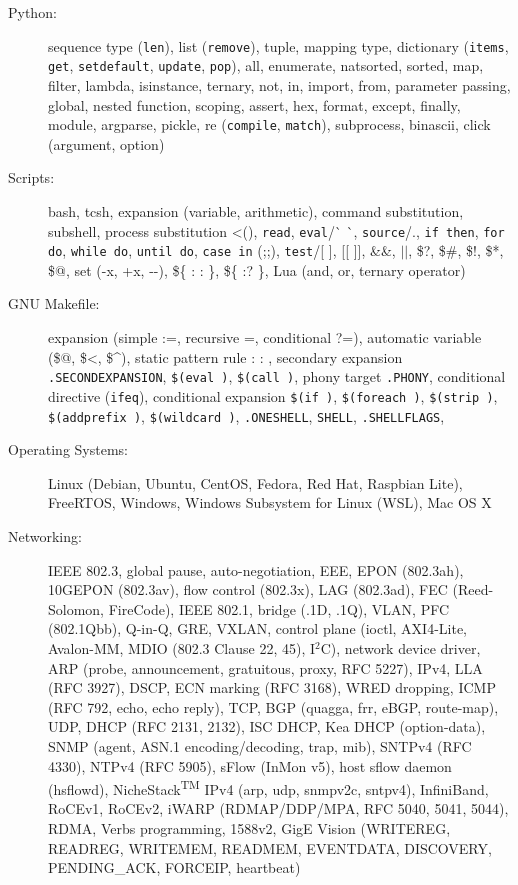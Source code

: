 \documentclass[letterpaper,11pt]{article}
\begin{document}
\begin{description}
\item[Python:] sequence type ({\tt len}), list ({\tt remove}), tuple, mapping type,
dictionary ({\tt items}, {\tt get}, {\tt setdefault}, {\tt update}, {\tt pop}),
all,
enumerate, natsorted, sorted, map, filter, lambda, isinstance, ternary, not, in, import, from, parameter passing,
global, nested function, scoping, assert, hex, format,
except, finally, module, argparse, pickle, re ({\tt compile}, {\tt match}), subprocess, binascii, click (argument, option)

\item[Scripts:] bash, tcsh, expansion (variable, arithmetic), command substitution, subshell, process substitution \textless(), {\tt read},
{\tt eval}/\`{} \`{}, {\tt source}/.,
{\tt if then}, {\tt for do}, {\tt while do}, {\tt until do}, {\tt case in} (;;), {\tt test}/[ ], [[ ]], \&\&, $||$, \$?, \$\#, \$!, \$*, \$@,
set (-x, +x, -{}-),
\$\{ : : \}, \$\{ :? \},
Lua (and, or, ternary operator)

\item[GNU Makefile:] expansion (simple :=, recursive =, conditional ?=), automatic variable (\$@, \$\textless, \$\^{}),
static pattern rule : : , secondary expansion {\tt .SECONDEXPANSION},
{\tt \$(eval )}, {\tt \$(call )},
phony target {\tt .PHONY},
conditional directive ({\tt ifeq}), conditional expansion {\tt \$(if )}, {\tt \$(foreach )}, {\tt \$(strip )}, {\tt \$(addprefix )},
{\tt \$(wildcard )},
{\tt .ONESHELL}, {\tt SHELL}, {\tt .SHELLFLAGS},


\item[Operating Systems:] Linux (Debian, Ubuntu, CentOS, Fedora, Red Hat, Raspbian Lite), FreeRTOS, Windows, Windows Subsystem for Linux (WSL), Mac OS X

\item[Networking:] IEEE 802.3, global pause, auto-negotiation, EEE, EPON (802.3ah), 10GEPON (802.3av), flow control (802.3x), LAG (802.3ad),
FEC (Reed-Solomon, FireCode),
IEEE 802.1, bridge (.1D, .1Q), VLAN, PFC (802.1Qbb), Q-in-Q, GRE, VXLAN,
control plane (ioctl, AXI4-Lite, Avalon-MM, MDIO (802.3 Clause 22, 45), I$^2$C),
network device driver, ARP (probe, announcement, gratuitous, proxy, RFC 5227), IPv4, LLA (RFC 3927), DSCP, ECN marking (RFC 3168), WRED dropping,
ICMP (RFC 792, echo, echo reply),
TCP, BGP (quagga, frr, eBGP, route-map),
UDP, DHCP (RFC 2131, 2132), ISC DHCP, Kea DHCP (option-data), SNMP (agent, ASN.1 encoding/decoding, trap, mib), SNTPv4 (RFC 4330), NTPv4 (RFC 5905),
sFlow (InMon v5), host sflow daemon (hsflowd),
%
NicheStack\textsuperscript{TM} IPv4 (arp, udp, snmpv2c, sntpv4),
%
InfiniBand, RoCEv1, RoCEv2,
iWARP (RDMAP/DDP/MPA, RFC 5040, 5041, 5044), RDMA, Verbs programming,
%
1588v2,
GigE Vision (WRITEREG, READREG, WRITEMEM, READMEM, EVENTDATA, DISCOVERY, PENDING\_ACK, FORCEIP, heartbeat)


\end{description}
\end{document}
